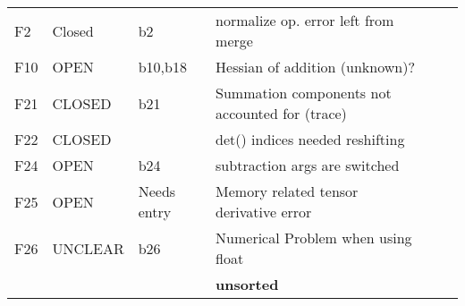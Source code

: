 \documentclass{article}
\begin{document}
\begin{tabular}{|l|ll|lll|}
 \hline 
  F2 &Closed &b2  & normalize op. error left from merge\\
  F10 &OPEN &b10,b18 &  Hessian of addition (unknown)?\\
   F21  &CLOSED&b21 &Summation components not accounted for (trace)\\
     F22  &CLOSED& & det() indices needed reshifting\\
     F24  &OPEN& b24& subtraction args are switched \\
     F25  &OPEN& Needs entry & Memory related tensor derivative error \\
     F26  &UNCLEAR& b26 & Numerical Problem when using float \\
  \hline
  \hline
 &&& \textbf{unsorted}\\
 \hline
\end{tabular}
\\





\end{document}
